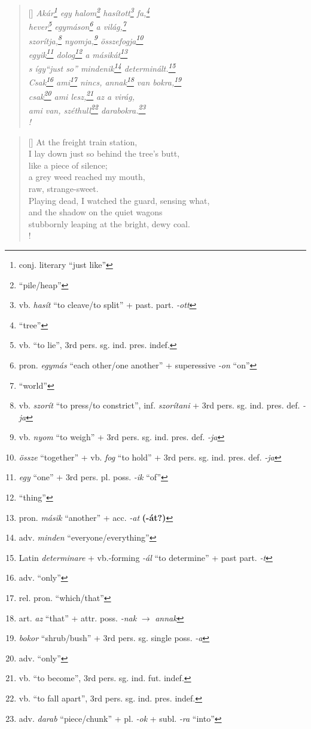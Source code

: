 \documentclass[a4paper,12pt,twoside,final]{book}
\begin{document}
\begin{verse}[\versewidth]
  \it
  Akár\footnote{conj. literary ``just like''} egy
  halom\footnote{``pile/heap''} hasított\footnote{vb.
  \emph{hasít} ``to cleave/to split'' +
  past. part. \emph{-ott} } fa,\footnote{``tree''} \\
  hever\footnote{vb. ``to lie'', 3rd pers. sg. ind. pres. indef.}
  egymáson\footnote{pron. \emph{egymás} ``each other/one
  another'' + superessive \emph{-on} ``on''} a világ,\footnote{``world''} \\
  szorítja,\footnote{vb. \emph{szorít} ``to press/to
  constrict'', inf. \emph{szorítani} + 3rd
  pers. sg. ind. pres. def. \emph{-ja}} nyomja,\footnote{vb.
  \emph{nyom} ``to weigh'' + 3rd pers. sg. ind. pres. def. \emph{-ja}}
  összefogja\footnote{\emph{össze} ``together'' + vb. \emph{fog}
  ``to hold'' + 3rd pers. sg. ind. pres. def. \emph{-ja}} \\
  egyik\footnote{\emph{egy} ``one'' + 3rd
  pers. pl. poss. \emph{-ik} ``of'' } dolog\footnote{``thing''} a
  másikát\footnote{pron. \emph{másik} ``another'' +
  acc. \emph{-at} \textbf{(-át?)}} \\
  s így\emph{``just so''} mindenik\footnote{adv. \emph{minden}
  ``everyone/everything''} determinált.\footnote{Latin \emph{determinare} +
  vb.-forming \emph{-ál} ``to determine'' + past part. \emph{-t}} \\
  Csak\footnote{adv. ``only''} ami\footnote{rel. pron. ``which/that''} nincs,
  annak\footnote{art. \emph{az} ``that'' + attr. poss. \emph{-nak}
  $\rightarrow$ \emph{annak}}
  van bokra,\footnote{\emph{bokor} ``shrub/bush'' + 3rd
  pers. sg. single poss. \emph{-a}} \\
  csak\footnote{adv. ``only''} ami lesz,\footnote{vb. ``to
  become'', 3rd pers. sg. ind. fut. indef.} az a virág, \\
  ami van, széthull\footnote{vb. ``to fall apart'',
  3rd pers. sg. ind. pres. indef.}
  darabokra.\footnote{adv. \emph{darab} ``piece/chunk'' +
  pl. \emph{-ok} + subl. \emph{-ra} ``into''} \\!
\end{verse}

\newpage


\settowidth{\versewidth}{stubbornly leaping at the bright, dewy coal.}

\begin{verse}[\versewidth]
  At the freight train station, \\
  I lay down just so behind the tree's butt, \\
  like a piece of silence; \\
  a grey weed reached my mouth, \\
  raw, strange-sweet. \\
  Playing dead, I watched the guard, sensing what, \\
  and the shadow on the quiet wagons \\
  stubbornly leaping at the bright, dewy coal. \\!
\end{verse}
\end{document}
